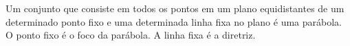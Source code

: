 \documentclass[\mainfilename]{subfiles}
\begin{document}
\begin{sectionBox}
    Um conjunto que consiste em todos os pontos em um plano equidistantes de um determinado ponto fixo e uma determinada linha fixa no plano é uma parábola. O ponto fixo é o foco da parábola. A linha fixa é a diretriz.


        


\end{sectionBox}
\end{document}
